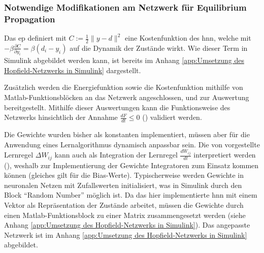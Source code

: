 \subsubsection{Notwendige Modifikationen am Netzwerk für Equilibrium Propagation}

Das \ac{ep} definiert mit \(C:=\frac{1}{2}\| y-d\| ^2\) eine Kostenfunktion des \ac{hnn}, welche mit \(-\beta\frac{\partial C}{\partial y_i}=\beta(d_i-y_i)\) auf die Dynamik der Zustände wirkt. Wie dieser Term in Simulink abgebildet werden kann, ist bereits im Anhang \ref{app:Umsetzung des Hopfield-Netzwerks in Simulink} dargestellt.

Zusätzlich werden die Energiefunktion sowie die Kostenfunktion mithilfe von Matlab-Funktionsblöcken an das Netzwerk angeschlossen, und zur Auswertung bereitgestellt. Mithilfe dieser Auswertungen kann die Funktionsweise des Netzwerks hinsichtlich der Annahme \(\frac{dF}{dt}\leq{0}\) (\cite[vgl. S. 3]{Scellier2017}) validiert werden.

Die Gewichte wurden bisher als konstanten implementiert, müssen aber für die Anwendung eines Lernalgorithmus dynamisch anpassbar sein. Die von \citeauthor{Scellier2017} vorgestellte Lernregel \(\Delta W_{ij}\) kann auch als Integration der Lernregel \(\frac{dW_{ij}}{dt}\) interpretiert werden (\cite[vgl. S. 5]{Scellier2017}), weshalb zur Implementierung der Gewichte Integratoren zum Einsatz kommen können (gleiches gilt für die Bias-Werte). Typischerweise werden Gewichte in neuronalen Netzen mit Zufallswerten initialisiert, was in Simulink durch den Block "`Random Number"' möglich ist. Da das hier implementierte \ac{hnn} mit einem Vektor als Repräsentation der Zustände arbeitet, müssen die Gewichte durch einen Matlab-Funktionsblock zu einer Matrix zusammengesetzt werden (siehe Anhang \ref{app:Umsetzung des Hopfield-Netzwerks in Simulink}). Das angepasste Netzwerk ist im Anhang \ref{app:Umsetzung des Hopfield-Netzwerks in Simulink} abgebildet.
